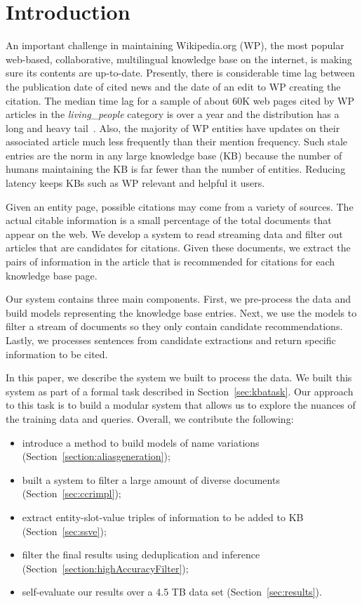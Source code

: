 
\section{Introduction}


An important challenge in maintaining Wikipedia.org (WP), the most popular 
web-based, collaborative, multilingual knowledge base on the internet, is  
making sure its contents are up-to-date. Presently, there is considerable time lag 
between the publication date of cited news and the date of an edit to WP 
creating the citation. The median time lag for a sample of about 60K
web pages cited by WP articles in the \textit{living\_people} category is over 
a year and the distribution has a long and heavy tail~\cite{JFrank12}. 
Also, the majority of WP entities have updates on their associated article much 
less frequently than their mention frequency. Such stale entries 
are the norm in any large knowledge base (KB) because the number of humans 
maintaining the KB is far fewer than the number of entities. 
Reducing latency keeps KBs such as WP relevant and helpful it users.

Given an entity page, possible citations may come from a variety of sources.
The actual citable information is a small percentage of the total documents that appear on the web.
We develop a system to read streaming data and filter out articles that are candidates for citations.
Given these documents, we extract the pairs of information in the 
article that is recommended for citations for each knowledge base page.

Our system contains three main components. First, we pre-process the data and
build models representing the knowledge base entries.
Next, we use the models to filter a stream of documents so they only contain 
candidate recommendations.
Lastly, we processes sentences from candidate extractions and return 
specific information to be cited.


In this paper, we describe the system we built to process the data.
We built this system as part of a formal task described in Section~\ref{sec:kbatask}.
Our approach to this task is to build a modular system
that allows us to explore the nuances of the training data and queries.
Overall, we contribute the following:
\begin{itemize}[noitemsep,nolistsep]
\item introduce a method to build models of name variations (Section~\ref{section:aliasgeneration});
\item built a system to filter a large amount of diverse documents (Section~\ref{sec:ccrimpl});
\item extract entity-slot-value triples of information to be added to KB (Section~\ref{sec:ssve});
\item filter the final results using deduplication and inference (Section~\ref{section:highAccuracyFilter});
\item self-evaluate our results over a 4.5 TB data set (Section~\ref{sec:results}).
\end{itemize}





